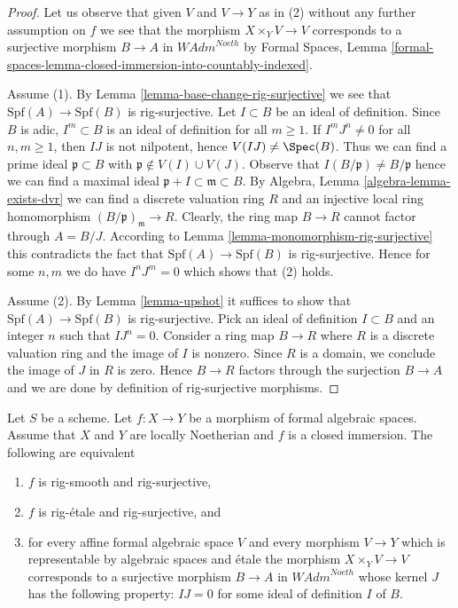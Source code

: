 \begin{proof}
Let us observe that given $V$ and $V \to Y$ as in (2) without any
further assumption on $f$ we see that the morphism $X \times_Y V \to V$
corresponds to a surjective morphism $B \to A$ in $\textit{WAdm}^{Noeth}$
by Formal Spaces, Lemma
\ref{formal-spaces-lemma-closed-immersion-into-countably-indexed}.

\medskip\noindent
Assume (1). By Lemma \ref{lemma-base-change-rig-surjective} we see that
$\text{Spf}(A) \to \text{Spf}(B)$ is rig-surjective.
Let $I \subset B$ be an ideal of definition. Since $B$ is adic,
$I^m \subset B$ is an ideal of definition for all $m \geq 1$.
If $I^m J^n \not = 0$ for all $n, m \geq 1$, then
$IJ$ is not nilpotent, hence $V(IJ) \not = \Spec(B)$.
Thus we can find a prime ideal $\mathfrak p \subset B$
with $\mathfrak p \not \in V(I) \cup V(J)$.
Observe that $I(B/\mathfrak p) \not = B/\mathfrak p$
hence we can find a maximal ideal
$\mathfrak p + I \subset \mathfrak m \subset B$.
By Algebra, Lemma \ref{algebra-lemma-exists-dvr}
we can find a discrete valuation ring $R$
and an injective local ring homomorphism $(B/\mathfrak p)_\mathfrak m \to R$.
Clearly, the ring map $B \to R$ cannot factor through $A = B/J$.
According to Lemma \ref{lemma-monomorphism-rig-surjective}
this contradicts the fact that $\text{Spf}(A) \to \text{Spf}(B)$
is rig-surjective. Hence for some $n, m$ we do have
$I^n J^m = 0$ which shows that (2) holds.

\medskip\noindent
Assume (2). By Lemma \ref{lemma-upshot} it suffices to show
that $\text{Spf}(A) \to \text{Spf}(B)$ is rig-surjective.
Pick an ideal of definition $I \subset B$ and an integer $n$
such that $I J^n = 0$.
Consider a ring map $B \to R$ where $R$ is a discrete valuation
ring and the image of $I$ is nonzero. Since $R$ is a domain, we
conclude the image of $J$ in $R$ is zero. Hence $B \to R$
factors through the surjection $B \to A$ and we are done by
definition of rig-surjective morphisms.
\end{proof}

\begin{lemma}
\label{lemma-closed-immersion-rig-smooth-rig-surjective}
Let $S$ be a scheme. Let $f : X \to Y$ be a morphism of formal algebraic
spaces. Assume that $X$ and $Y$ are locally Noetherian and $f$ is a
closed immersion. The following are equivalent
\begin{enumerate}
\item $f$ is rig-smooth and rig-surjective,
\item $f$ is rig-\'etale and rig-surjective, and
\item for every affine formal algebraic space $V$ and every morphism
$V \to Y$ which is representable by algebraic spaces and \'etale
the morphism $X \times_Y V \to V$ corresponds to a surjective morphism
$B \to A$ in $\textit{WAdm}^{Noeth}$ whose kernel $J$ has the following
property: $IJ = 0$ for some ideal of definition $I$ of $B$.
\end{enumerate}
\end{lemma}

